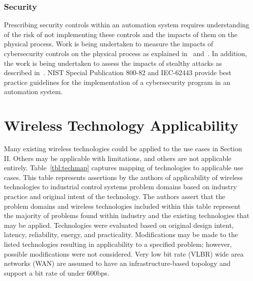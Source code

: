     \subsubsection{Security}
    Prescribing security controls within an automation system requires understanding of the risk of not implementing these controls and the impacts of them on the physical process. Work is being undertaken to measure the impacts of cybersecurity controls on the physical process as explained in~\cite{candell2015industrial} and~\cite{candell2015measuring}. In addition, the work is being undertaken to assess the impacts of stealthy attacks as described in~\cite{urbina2016limiting}. NIST Special Publication 800-82 and IEC-62443 provide best practice guidelines for the implementation of a cybersecurity program in an automation system.
    
    \section{Wireless Technology Applicability}
    Many existing wireless technologies could be applied to the use cases in Section II.  Others may be applicable with limitations, and others are not applicable entirely. Table~\ref{tbl:techmap} captures mapping of technologies to applicable use cases.  This table represents assertions by the authors of applicability of wireless technologies to industrial control systems problem domains based on industry practice and original intent of the technology.  The authors assert that the problem domains and wireless technologies included within this table represent the majority  of problems found within industry and the existing technologies that may be applied.  Technologies were evaluated based on original design intent, latency, reliability, energy, and practicality.  Modifications may be made to the listed technologies resulting in applicability to a specified problem; however, possible modifications were not considered.  Very low bit rate (VLBR) wide area networks (WAN) are assumed to have an infrastructure-based  topology and support a bit rate of under 600bps. 
    

